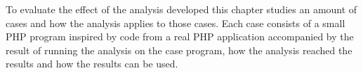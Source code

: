 To evaluate the effect of the analysis developed this chapter studies an amount of cases and how the analysis applies to those cases. Each case consists of a small PHP program inspired by code from a real PHP application accompanied by the result of running the analysis on the case program, how the analysis reached the results and how the results can be used.

